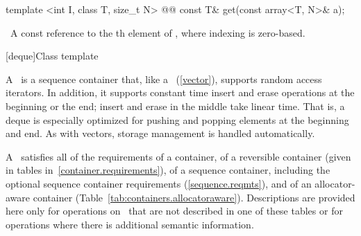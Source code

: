 \documentclass[american,twoside]{book}
\begin{document}
%
%
\begin{itemdecl}
template <int I, class T, size_t N> 
  @@
  const T& get(const array<T, N>& a); 
\end{itemdecl}

\begin{itemdescr}
\pnum
{}

\pnum
\returns\ A const reference to the th element of , 
where indexing is zero-based.
\end{itemdescr}

[deque]{Class template }%

\pnum
{}
A
\
is a sequence container that, like a
\
(\ref{vector}), supports random access iterators.
In addition, it supports constant time insert and erase operations at the beginning or the end;
insert and erase in the middle take linear time.
That is, a deque is especially optimized for pushing and popping elements at the beginning and end.
As with vectors, storage management is handled automatically.

\pnum
A
\
satisfies all of the requirements of a container, of a reversible container
(given in tables in~\ref{container.requirements}), of a sequence container,
including the optional sequence container requirements
(\ref{sequence.reqmts}), and of an allocator-aware container (Table~\ref{tab:containers.allocatoraware}).
Descriptions are provided here only for operations on
\tcode{deque}\
that are not described in one of these tables
or for operations where there is additional semantic information.
\end{document}
